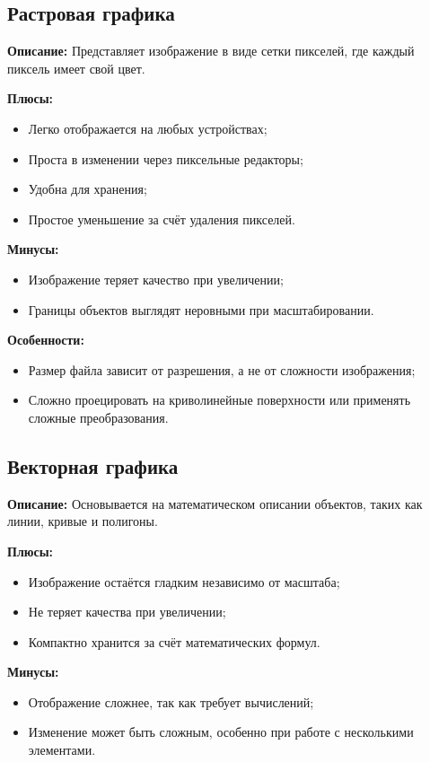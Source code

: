 
\subsection{Растровая графика}
\textbf{Описание:}
Представляет изображение в виде сетки пикселей, где каждый пиксель имеет свой цвет.

\textbf{Плюсы:}
\begin{itemize}
    \item Легко отображается на любых устройствах;
    \item Проста в изменении через пиксельные редакторы;
    \item Удобна для хранения;
    \item Простое уменьшение за счёт удаления пикселей.
\end{itemize}

\textbf{Минусы:}
\begin{itemize}
    \item Изображение теряет качество при увеличении;
    \item Границы объектов выглядят неровными при масштабировании.
\end{itemize}

\textbf{Особенности:}
\begin{itemize}
    \item Размер файла зависит от разрешения, а не от сложности изображения;
    \item Сложно проецировать на криволинейные поверхности или применять сложные преобразования.
\end{itemize}

\subsection{Векторная графика}
\textbf{Описание:}
Основывается на математическом описании объектов, таких как линии, кривые и полигоны.

\textbf{Плюсы:}
\begin{itemize}
    \item Изображение остаётся гладким независимо от масштаба;
    \item Не теряет качества при увеличении;
    \item Компактно хранится за счёт математических формул.
\end{itemize}

\textbf{Минусы:}
\begin{itemize}
    \item Отображение сложнее, так как требует вычислений;
    \item Изменение может быть сложным, особенно при работе с несколькими элементами.
\end{itemize}

